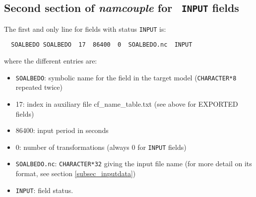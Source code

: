 \subsection{Second section of {\it namcouple} for {\tt
  INPUT} fields}
\label{subsubsec_secondINPUT}

  The first and only line for fields with status {\tt INPUT} is:

  \begin{verbatim}
  SOALBEDO SOALBEDO  17  86400  0  SOALBEDO.nc  INPUT\end{verbatim} where the different entries are:
  \begin{itemize}
  \item  {\tt SOALBEDO}: symbolic name for the field in the target
  model ({\tt CHARACTER*8} repeated twice)
  \item 17:  index in auxiliary file cf\_name\_table.txt (see above for EXPORTED fields)
  \item 86400: input period in seconds
  \item 0: number of transformations (always 0 for {\tt INPUT} fields)
  \item {\tt SOALBEDO.nc}: {\tt CHARACTER*32} giving the input file
  name (for more detail on its format, see section
  \ref{subsec_inputdata})
  \item {\tt INPUT}: field status.
  \end{itemize}

